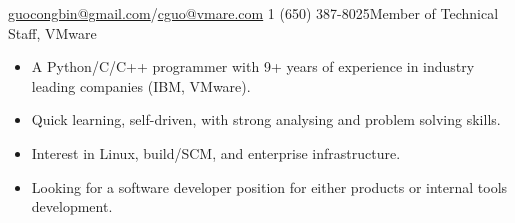 \documentclass[10pt,letterpaper]{article}
\begin{document}
 



\noindent\href{mailto:guocongbin@gmail.com}{guocongbin@gmail.com}/\href{mailto:cguo@vmware.com}{cguo@vmare.com}\bull
\textsmaller{+}1 (650) 387-8025\bull Member of Technical Staff, VMware

\spacedhrule{0.5em}{-0.4em} %




\begin{itemize}
    \itemsep0em
    \item A Python/C/C++ programmer with 9+ years of experience in industry
        leading companies (IBM, VMware).
    \item Quick learning, self-driven, with strong analysing and problem solving
        skills.
    \item Interest in Linux, build/SCM, and enterprise infrastructure.
    \item Looking for a software developer position for either products or
        internal tools development.
\end{itemize}

\spacedhrule{0.5em}{-0.4em} %

\end{document}
